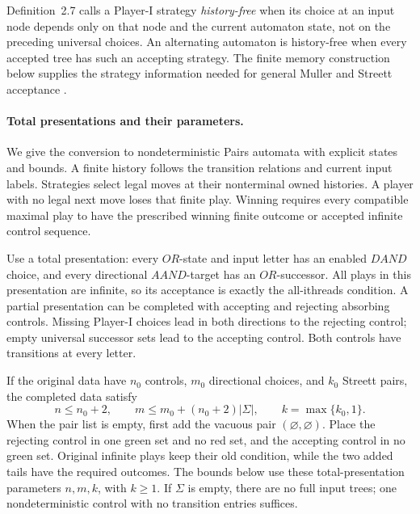 Definition~2.7 calls a Player-I strategy \emph{history-free} when its choice at
an input node depends only on that node and the current automaton state, not on
the preceding universal choices.  An alternating automaton is history-free
when every accepted tree has such an accepting strategy.
The finite memory construction below supplies the strategy information
needed for general Muller and Streett acceptance
\cite[\S2]{EmersonJutla1991}.

\paragraph{Total presentations and their parameters.}
\label{sec:p09-emerson-jutla-nondeterminization}
We give the conversion to
nondeterministic Pairs automata
with explicit states and
bounds. A finite history
follows the transition
relations and current input
labels. Strategies select
legal moves at their
nonterminal owned histories.
A player with no legal
next move loses that
finite play. Winning
requires every compatible
maximal play to have
the prescribed winning
finite outcome or accepted
infinite control sequence.

Use a total presentation:
every \(OR\)-state and
input letter has an
enabled \(DAND\) choice,
and every directional
\(AAND\)-target has an
\(OR\)-successor.
All plays in this
presentation are infinite,
so its acceptance is
exactly the all-ithreads
condition.
A partial presentation
can be completed with
accepting and rejecting
absorbing controls.
Missing Player-I choices
lead in both directions
to the rejecting control;
empty universal successor
sets lead to the
accepting control.
Both controls have
transitions at every
letter.

If the original data
have \(n_0\) controls,
\(m_0\) directional choices,
and \(k_0\) Streett pairs,
the completed data satisfy
\[
 n\leq n_0+2,\qquad
 m\leq m_0+(n_0+2)|\Sigma|,\qquad
 k=\max\{k_0,1\}.
\]
When the pair list
is empty, first add
the vacuous pair
\((\varnothing,\varnothing)\).
Place the rejecting
control in one green
set and no red set,
and the accepting
control in no green
set. Original infinite
plays keep their old
condition, while the
two added tails have
the required outcomes.
The bounds below use
these total-presentation
parameters \(n,m,k\),
with \(k\geq1\).
If \(\Sigma\) is empty,
there are no full
input trees; one
nondeterministic control
with no transition
entries suffices.

